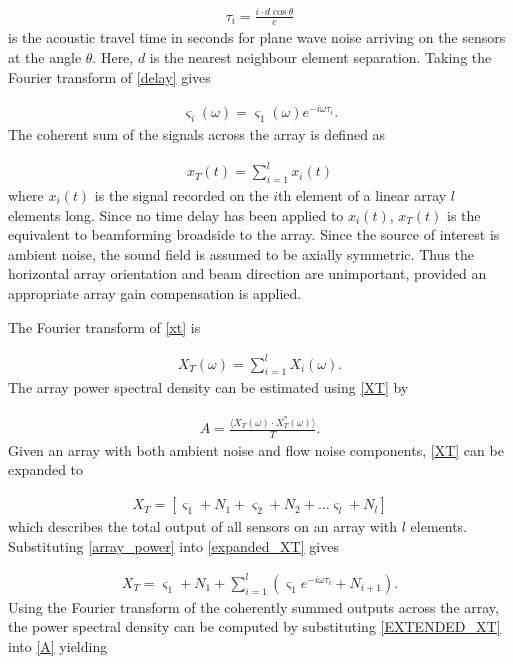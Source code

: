 \documentclass[12pt,journal,onecolumn]{IEEEtran}
\begin{document}
\begin{align}
\tau_i = \frac{i\cdot d \cos\theta}{c}
\label{tau}
\end{align}
is the acoustic travel time in seconds for plane wave noise arriving on the sensors at the angle $\theta$. Here, $d$ is the nearest neighbour element separation.  Taking the Fourier transform of \eqref{delay} gives 

\begin{align}
\varsigma_i(\omega) = \varsigma_1(\omega) e^{-i \omega \tau_{i}}.
\label{array_power}
\end{align}
The coherent sum of the signals across the array is defined as 

\begin{align}
x_T(t) = \sum_{i = 1}^{l} x_i(t)
\label{xt}
\end{align}
where $x_i(t)$ is the signal recorded on the $i$th element of a linear array $l$ elements long. Since no time delay has been applied to $x_i(t)$, $x_T(t)$ is the equivalent to beamforming broadside to the array. Since the source of interest is ambient noise, the sound field is assumed to be axially symmetric. Thus the horizontal array orientation and beam direction are unimportant, provided an appropriate array gain compensation is applied. 

The Fourier transform of \eqref{xt} is 

\begin{align}
X_T(\omega) = \sum_{i = 1}^{l} X_i(\omega).
\label{XT}
\end{align}
The array power spectral density can be estimated using \eqref{XT} by

\begin{align}
A = \frac{\langle X_T(\omega) \cdot X^*_T(\omega) \rangle}{T}.
\label{A}
\end{align}
Given an array with both ambient noise and flow noise components, \eqref{XT} can be expanded to

\begin{align}
X_T = [ \varsigma_1 + N_1 + \varsigma_2 + N_2 + \dots \varsigma_l + N_l ]
\label{expanded_XT}
\end{align}
which describes the total output of all sensors on an array with $l$ elements. Substituting \eqref{array_power} into \eqref{expanded_XT} gives

\begin{align}
X_T = \varsigma_1 + N_1 + \sum_{i=1}^{l}( \varsigma_1 e^{-i \omega \tau_{i}} + N_{i+1}).
\label{EXTENDED_XT}
\end{align}
Using the Fourier transform of the coherently summed outputs across the array, the power spectral density can be computed by substituting \eqref{EXTENDED_XT} into \eqref{A} yielding
\end{document}
